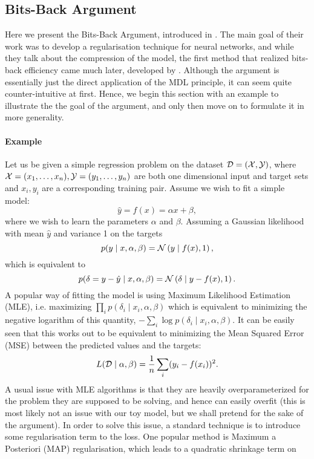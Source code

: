 \subsection{Bits-Back Argument}
Here we present the Bits-Back Argument, introduced in
\cite{hinton1993keeping}. The main goal of their work was to develop a
regularisation technique for neural networks, and while they talk about the
compression of the model, the first method that realized bits-back
 efficiency came much later, developed by \cite{havasi2018minimal}. 
Although the argument is essentially just the direct application of the MDL
principle, it can seem quite counter-intuitive at first. Hence, we begin this
section with an example to illustrate the the goal of the argument,
and only then move on to formulate it in more generality.

\paragraph{Example}
Let us be given a simple regression problem on the dataset $\mathcal{D} = (\mathcal{X}, \mathcal{Y})$,
where $\mathcal{X} = (x_1, \hdots, x_n), \mathcal{Y} = (y_1, \hdots, y_n)$ are both one
dimensional input and target sets and $x_i, y_i$ are a corresponding training
pair. Assume we wish to fit a simple model:
\[
  \hat{y} = f(x) = \alpha x + \beta,
\]
where we wish to learn the parameters $\alpha$ and $\beta$.
Assuming a Gaussian likelihood with mean $\hat{y}$ and variance 1 on the targets
\[
  p(y \mid x, \alpha, \beta) = \mathcal{N}\left( y \mid f(x), 1 \right),
\]
which is equivalent to
\[
  p(\delta = y - \hat{y} \mid x, \alpha, \beta) = \mathcal{N}\left( \delta \mid y - f(x), 1 \right).
\]
A popular way of fitting the model is using Maximum Likelihood Estimation (MLE),
i.e. maximizing $\prod_i p(\delta_i \mid x_i, \alpha, \beta)$ which is equivalent to
minimizing the negative logarithm of this quantity, $-\sum_i \log p(\delta_i \mid
x_i, \alpha, \beta)$. It can be easily seen that this works out to be equivalent
to minimizing the Mean Squared Error (MSE) between the predicted values and the
targets:
\[
  L(\mathcal{D} \mid \alpha, \beta) = \frac{1}{n} \sum_i (y_i - f(x_i))^2.
\]
A usual issue with MLE algorithms is that they are heavily overparameterized for
the problem they are supposed to be solving, and hence can easily overfit (this
is most likely not an issue with our toy model, but we shall pretend for the
sake of the argument). In order to solve this issue, a standard technique is to
introduce some regularisation term to the loss. One popular method is Maximum a
Posteriori (MAP) regularisation, which leads to a quadratic shrinkage term on
